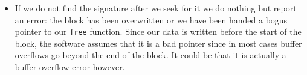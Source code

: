\documentclass[12pt,a4paper]{memoir} %
\begin{document}
{{\begin{itemize}
to avoid that its data is used again (line 21).
\item
If we do not find the signature after we seek for it we do nothing but report an error:
the block has been overwritten or we have been handed a bogus pointer to our \verb,free,
function. Since our data is written before the start of the block, the software assumes
that it is a bad pointer since in most cases buffer overflows go beyond the end
of the block. It could be that it is actually a buffer overflow error however.
\end{itemize}
}}
\end{document}

